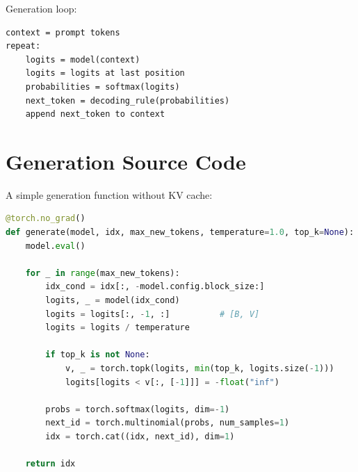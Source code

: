 \begin{center}
\end{center}

Generation loop:

\begin{lstlisting}
context = prompt tokens
repeat:
    logits = model(context)
    logits = logits at last position
    probabilities = softmax(logits)
    next_token = decoding_rule(probabilities)
    append next_token to context
\end{lstlisting}

\section{Generation Source Code}

A simple generation function without KV cache:

\begin{lstlisting}[language=Python]
@torch.no_grad()
def generate(model, idx, max_new_tokens, temperature=1.0, top_k=None):
    model.eval()

    for _ in range(max_new_tokens):
        idx_cond = idx[:, -model.config.block_size:]
        logits, _ = model(idx_cond)
        logits = logits[:, -1, :]          # [B, V]
        logits = logits / temperature

        if top_k is not None:
            v, _ = torch.topk(logits, min(top_k, logits.size(-1)))
            logits[logits < v[:, [-1]]] = -float("inf")

        probs = torch.softmax(logits, dim=-1)
        next_id = torch.multinomial(probs, num_samples=1)
        idx = torch.cat((idx, next_id), dim=1)

    return idx
\end{lstlisting}

